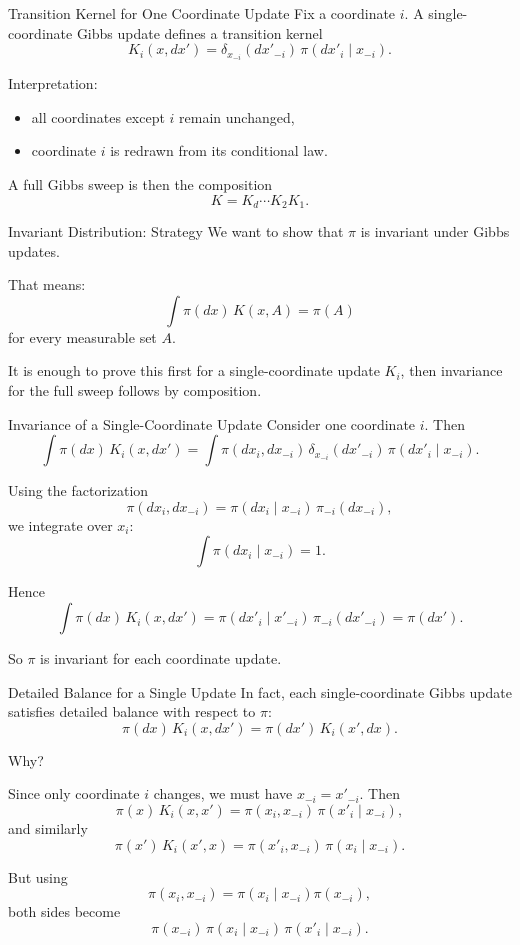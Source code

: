 \documentclass[aspectratio=169]{beamer}
\begin{document}
\begin{frame}{Transition Kernel for One Coordinate Update}
Fix a coordinate \(i\). A single-coordinate Gibbs update defines a transition kernel
\[
K_i(x,dx')
=
\delta_{x_{-i}}(dx'_{-i})\,\pi(dx'_i\mid x_{-i}).
\]

Interpretation:
\begin{itemize}
    \item all coordinates except \(i\) remain unchanged,
    \item coordinate \(i\) is redrawn from its conditional law.
\end{itemize}

A full Gibbs sweep is then the composition
\[
K = K_d \cdots K_2 K_1.
\]
\end{frame}

\begin{frame}{Invariant Distribution: Strategy}
We want to show that \(\pi\) is invariant under Gibbs updates.

\medskip

That means:
\[
\int \pi(dx)\, K(x,A) = \pi(A)
\]
for every measurable set \(A\).

It is enough to prove this first for a single-coordinate update \(K_i\), then invariance for the full sweep follows by composition.
\end{frame}

\begin{frame}{Invariance of a Single-Coordinate Update}
Consider one coordinate \(i\). Then
\[
\int \pi(dx)\,K_i(x,dx')
=
\int \pi(dx_i,dx_{-i})\,\delta_{x_{-i}}(dx'_{-i})\,\pi(dx'_i\mid x_{-i}).
\]

Using the factorization
\[
\pi(dx_i,dx_{-i}) = \pi(dx_i\mid x_{-i})\,\pi_{-i}(dx_{-i}),
\]
we integrate over \(x_i\):
\[
\int \pi(dx_i\mid x_{-i}) = 1.
\]

Hence
\[
\int \pi(dx)\,K_i(x,dx')
=
\pi(dx'_i\mid x'_{-i})\,\pi_{-i}(dx'_{-i})
=
\pi(dx').
\]

So \(\pi\) is invariant for each coordinate update.
\end{frame}

\begin{frame}{Detailed Balance for a Single Update}
In fact, each single-coordinate Gibbs update satisfies detailed balance with respect to \(\pi\):
\[
\pi(dx)\,K_i(x,dx')
=
\pi(dx')\,K_i(x',dx).
\]

Why?

\medskip

Since only coordinate \(i\) changes, we must have \(x_{-i}=x'_{-i}\). Then
\[
\pi(x)\,K_i(x,x')
=
\pi(x_i,x_{-i})\,\pi(x'_i\mid x_{-i}),
\]
and similarly
\[
\pi(x')\,K_i(x',x)
=
\pi(x'_i,x_{-i})\,\pi(x_i\mid x_{-i}).
\]

But using
\[
\pi(x_i,x_{-i})=\pi(x_i\mid x_{-i})\pi(x_{-i}),
\]
both sides become
\[
\pi(x_{-i})\,\pi(x_i\mid x_{-i})\,\pi(x'_i\mid x_{-i}).
\]
\end{frame}
\end{document}
